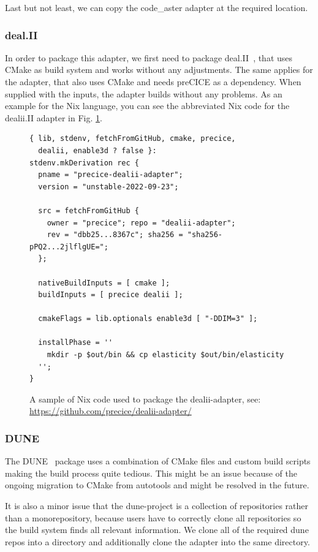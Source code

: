 \documentclass{eceasst}
\begin{document}
Last but not least, we can copy the code\_aster adapter at the required location.\\

\subsubsection{deal.II}

In order to package this adapter, we first need to package deal.II~\cite{dealII95}, that uses CMake as build system and works without any adjustments.
The same applies for the adapter, that also uses CMake and needs preCICE as a dependency.
When supplied with the inputs, the adapter builds without any problems.
As an example for the Nix language, you can see the abbreviated Nix code for the dealii.II adapter in Fig. \ref{lst:dealii-adapter-nix}.\\

\begin{figure}
    \normalsize
    \begin{verbatim}
{ lib, stdenv, fetchFromGitHub, cmake, precice,
  dealii, enable3d ? false }:
stdenv.mkDerivation rec {
  pname = "precice-dealii-adapter";
  version = "unstable-2022-09-23";

  src = fetchFromGitHub {
    owner = "precice"; repo = "dealii-adapter";
    rev = "dbb25...8367c"; sha256 = "sha256-pPQ2...2jlflgUE=";
  };

  nativeBuildInputs = [ cmake ];
  buildInputs = [ precice dealii ];

  cmakeFlags = lib.optionals enable3d [ "-DDIM=3" ];

  installPhase = ''
    mkdir -p $out/bin && cp elasticity $out/bin/elasticity
  '';
}
    \end{verbatim}
    \caption{A sample of Nix code used to package the dealii-adapter, see: \url{https://github.com/precice/dealii-adapter/}}
    \label{lst:dealii-adapter-nix}
\end{figure}

\subsubsection{DUNE}

The DUNE~\cite{bastian2020dune} package uses a combination of CMake files and custom build scripts making the build process quite tedious.
This might be an issue because of the ongoing migration to CMake from autotools and might be resolved in the future.

It is also a minor issue that the dune-project is a collection of repositories rather than a monorepository, because users have to correctly clone all repositories so the build system finds all relevant information.
We clone all of the required dune repos into a directory and additionally clone the adapter into the same directory.
\end{document}
